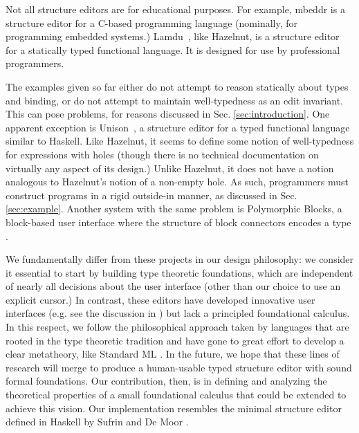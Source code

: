 \documentclass[9pt]{sigplanconf}
\begin{document}
Not all structure editors are for educational purposes. For example,
mbeddr \cite{voelter_mbeddr:_2012} is a structure editor for a C-based
programming language (nominally, for programming embedded systems.)
Lamdu~\cite{lamdu}, like Hazelnut, is a structure editor for a statically
typed functional language. It is designed for use by professional
programmers.

The examples given so far either do not attempt to reason statically about
types and binding, or do not attempt to maintain well-typedness as an edit
invariant. This can pose problems, for reasons discussed in Sec. \ref{sec:introduction}. One apparent exception is Unison~\cite{unison}, a structure
editor for a typed functional language similar to Haskell. Like Hazelnut,
it seems to define some notion of well-typedness for expressions with holes
(though there is no technical documentation on virtually any aspect of its
design.) Unlike Hazelnut, it does not have a notion analogous to Hazelnut's
notion of a non-empty hole. As such, programmers must construct programs in
a rigid outside-in manner, as discussed in Sec. \ref{sec:example}. Another
system with the same problem is Polymorphic Blocks, a block-based user
interface where the structure of block connectors encodes a
type \cite{DBLP:conf/chi/LernerFG15}.

We fundamentally differ from these projects in our design philosophy: we
consider it essential to start by building type theoretic foundations,
which are independent of nearly all decisions about the user interface (other than our choice to use an explicit cursor.) In
contrast, these editors have developed innovative user interfaces (e.g. see
the discussion in \cite{DBLP:conf/sle/VolterSBK14}) but lack a principled
foundational calculus. In this respect, we follow the philosophical
approach taken by languages that are rooted in the type theoretic tradition
and have gone to great effort to develop a clear metatheory, like Standard
ML \cite{mthm97-for-dart,Harper00atype-theoretic,Lee:2007:TMM:1190216.1190245}.  In the future, we hope
that these lines of research will merge to produce a human-usable typed
structure editor with sound formal foundations. Our contribution, then, is
in defining and analyzing the theoretical properties of a small
foundational calculus that could be extended to achieve this vision. 
Our implementation resembles the minimal structure editor defined in 
Haskell by Sufrin and De Moor \cite{sufrin1999modeless}. 
\end{document}
